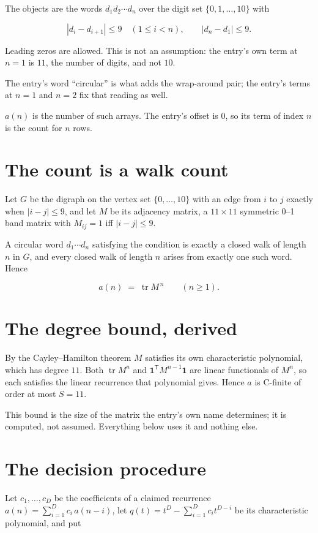 \documentclass[11pt]{article}
\theoremstyle{definition}
\begin{document}
The objects are the words $d_1 d_2 \cdots d_n$ over the digit set $\{0,1,\dots,10\}$ with

\[|d_i - d_{i+1}| \le 9\quad (1 \le i < n), \qquad |d_n - d_1| \le 9.\]

Leading zeros are allowed. This is not an assumption: the entry's own term at $n=1$ is $11$, the number of digits, and not $10$.

The entry's word ``circular'' is what adds the wrap-around pair; the entry's terms at $n = 1$ and $n = 2$ fix that reading as well.

$a(n)$ is the number of such arrays. The entry's offset is 0, so its term of index $n$ is the count for $n$ rows.

\section{The count is a walk count}

Let $G$ be the digraph on the vertex set $\{0,\dots,10\}$ with an edge from $i$ to $j$ exactly when $|i-j| \le 9$, and let $M$ be its adjacency matrix, a $11 \times 11$ symmetric 0--1 band matrix with $M_{ij} = 1$ iff $|i-j| \le 9$.

A circular word $d_1\cdots d_n$ satisfying the condition is exactly a closed walk of length $n$ in $G$, and every closed walk of length $n$ arises from exactly one such word. Hence

\[a(n) \;=\; \operatorname{tr} M^{\,n} \qquad (n \ge 1).\]

\section{The degree bound, derived}

By the Cayley--Hamilton theorem $M$ satisfies its own characteristic polynomial, which has degree $11$. Both $\operatorname{tr} M^n$ and $\mathbf 1^{\mathsf T} M^{n-1} \mathbf 1$ are linear functionals of $M^{n}$, so each satisfies the linear recurrence that polynomial gives. Hence $a$ is C-finite of order at most $S = 11$.

This bound is the size of the matrix the entry's own name determines; it is computed, not assumed. Everything below uses it and nothing else.

\section{The decision procedure}

Let $c_1,\dots,c_D$ be the coefficients of a claimed recurrence $a(n) = \sum_{i=1}^{D} c_i\,a(n-i)$, let $q(t) = t^{D} - \sum_{i=1}^{D} c_i t^{D-i}$ be its characteristic polynomial, and put
\end{document}
